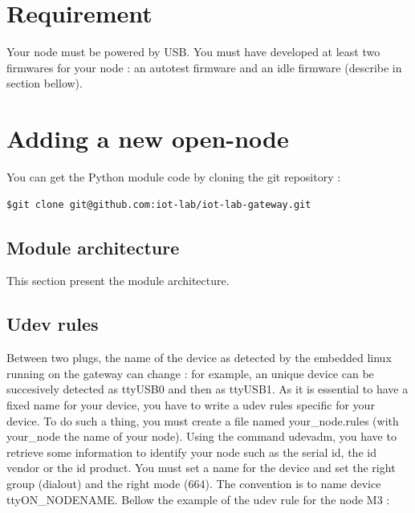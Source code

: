 \documentclass[12pt,a4paper,twoside]{article}
\begin{document}
\section{Requirement}
Your node must be powered by USB.\newline
You must have developed at least two firmwares for your node : an autotest firmware and an idle firmware (describe in section bellow).\newline
\section{Adding a new open-node}
You can get the Python module code by cloning the git repository :
\begin{verbatim}
$git clone git@github.com:iot-lab/iot-lab-gateway.git
\end{verbatim}
\subsection{Module architecture}
This section present the module architecture.
\medskip
{}
\subsection{Udev rules}
Between two plugs, the name of the device as detected by the embedded linux running on the gateway can change : for example, an unique device can be succesively detected as ttyUSB0 and then as ttyUSB1.\newline 
As it is essential to have a fixed name for your device, you have to write a udev rules specific for your device.\newline
To do such a thing, you must create a file named your\_node.rules (with your\_node the name of your node).\newline
Using the command udevadm, you have to retrieve some information to identify your node such as the serial id, the id vendor or the id product. You must set a name for the device and set the right group (dialout) and the right mode (664). The convention is to name device ttyON\_NODENAME. \newline
Bellow the example of the udev rule for the node M3 : 
\end{document}
